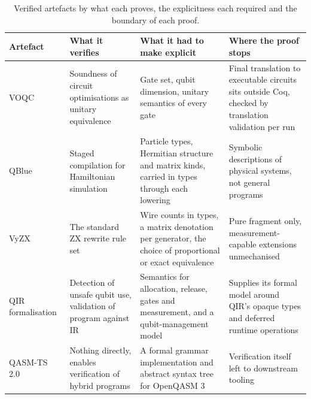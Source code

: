 \begin{table}[htbp]
    \centering
    \small
    \begin{tabularx}{\linewidth}{@{}lXXX@{}}
        \toprule
        Artefact & What it verifies & What it had to make explicit & Where the proof stops \\
        \midrule
        VOQC~\cite{hietala2023voqc} & Soundness of circuit optimisations as unitary equivalence & Gate set, qubit dimension, unitary semantics of every gate & Final translation to executable circuits sits outside Coq, checked by translation validation per run \\
        QBlue~\cite{verifiedcompiler2025qblue} & Staged compilation for Hamiltonian simulation & Particle types, Hermitian structure and matrix kinds, carried in types through each lowering & Symbolic descriptions of physical systems, not general programs \\
        VyZX~\cite{caldwell2026vyzx} & The standard ZX rewrite rule set & Wire counts in types, a matrix denotation per generator, the choice of proportional or exact equivalence & Pure fragment only, measurement-capable extensions unmechanised \\
        \makecell{QIR \\ formalisation~\cite{qirformalization2024}} & Detection of unsafe qubit use, validation of program against IR & Semantics for allocation, release, gates and measurement, and a qubit-management model & Supplies its formal model around QIR's opaque types and deferred runtime operations \\
        QASM-TS 2.0~\cite{openqasmts2024} & Nothing directly, enables verification of hybrid programs & A formal grammar implementation and abstract syntax tree for OpenQASM 3 & Verification itself left to downstream tooling \\
        \bottomrule
    \end{tabularx}
    \caption{Verified artefacts by what each proves, the explicitness each required and the boundary of each proof.}
    \label{tab:lit_rev:compilation:verified_artefacts}
\end{table}

